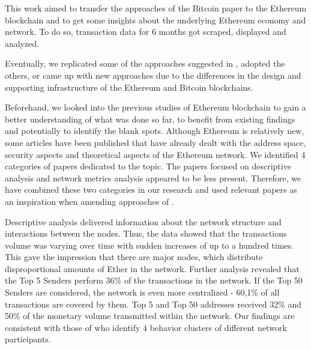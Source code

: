 This work aimed to transfer the approaches of the Bitcoin paper \cite{lischke2016analyzing} to the Ethereum blockchain and to get some insights about the underlying Ethereum economy and network. 
To do so, transaction data for 6 months got scraped, displayed and analyzed.

Eventually, we replicated some of the approaches suggested in \cite{lischke2016analyzing}, adopted the others, or came up with new approaches due to the differences in the design and supporting infrastructure of the Ethereum and Bitcoin blockchains.

Beforehand, we looked into the previous studies of Ethereum blockchain to gain a better understanding of what was done so far, to benefit from existing findings and potentially to identify the blank spots.
Although Ethereum is relatively new, some articles have been published that have already dealt with the address space, security aspects and theoretical aspects of the Ethereum network.
We identified 4 categories of papers dedicated to the topic.
The papers focused on descriptive analysis and network metrics analysis appeared to be less present.
Therefore, we have combined these two categories in our research and used relevant papers as an inspiration when amending approaches of \cite{lischke2016analyzing}.



Descriptive analysis delivered information about the network structure and interactions between the nodes.
Thus, the data showed that the transactions volume was varying over time with sudden increases of up to a hundred times.
This gave the impression that there are major nodes, which distribute disproportional amounts of Ether in the network.
Further analysis revealed that the Top 5 Senders perform 36\% of the transactions in the network.
If the Top 50 Senders are considered, the network is even more centralized - 60,1\% of all transactions are covered by them.
Top 5 and Top 50 addresses received 32\% and 50\% of the monetary volume transmitted within the network.
Our findings are consistent with those of \cite{payette2017characterizing} who identify 4 behavior clusters of different network participants.

